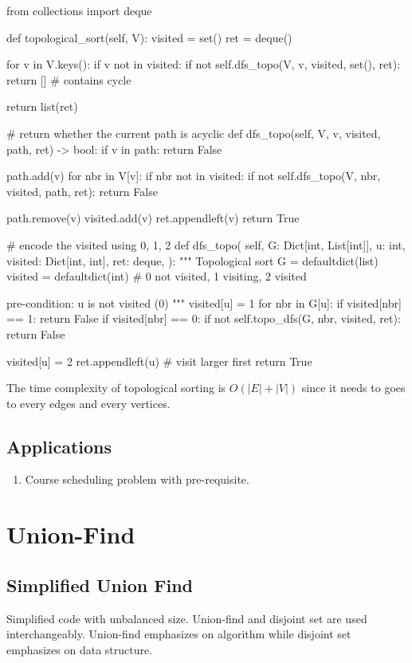 \begin{python}
from collections import deque

def topological_sort(self, V):
  visited = set()
  ret = deque()

  for v in V.keys():
    if v not in visited:
      if not self.dfs_topo(V, v, visited, set(), ret):
        return []  # contains cycle

  return list(ret)

# return whether the current path is acyclic
def dfs_topo(self, V, v, visited, path, ret) -> bool:
  if v in path:
    return False

  path.add(v)
  for nbr in V[v]:
    if nbr not in visited:
      if not self.dfs_topo(V, nbr, visited, path, ret):
        return False

  path.remove(v)
  visited.add(v)
  ret.appendleft(v)
  return True

# encode the visited using 0, 1, 2
def dfs_topo(
  self, 
  G: Dict[int, List[int]], 
  u: int, 
  visited: Dict[int, int],
  ret: deque,
):
  """
  Topological sort
  G = defaultdict(list)
  visited = defaultdict(int) 
  # 0 not visited, 1 visiting, 2 visited

  pre-condition: u is not visited (0)
  """
  visited[u] = 1
  for nbr in G[u]:
    if visited[nbr] == 1:
      return False
    if visited[nbr] == 0:
      if not self.topo_dfs(G, nbr, visited, ret):
        return False

  visited[u] = 2
  ret.appendleft(u)  # visit larger first
  return True
\end{python}
The time complexity of topological sorting is $O(|E|+|V|)$ since it needs to goes to every edges and every vertices. 

\subsection{Applications}
\begin{enumerate}
\item Course scheduling problem with pre-requisite.
\end{enumerate}

\section{Union-Find}\label{section:unionFind}
\subsection{Simplified Union Find}
Simplified code with unbalanced size. Union-find and disjoint set are used interchangeably. Union-find emphasizes on algorithm while disjoint set emphasizes on data structure.

